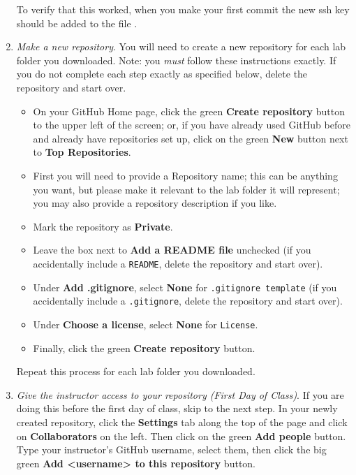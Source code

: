 \begin{enumerate}
    To verify that this worked, when you make your first commit the new ssh key should be added to the file .
  
    \item \emph{Make a new repository}.
    You will need to create a new repository for each lab folder you downloaded.
    Note: you \emph{must} follow these instructions exactly. 
    If you do not complete each step exactly as specified below, delete the repository and start over.
    \begin{itemize}
        \item On your GitHub Home page, click the green \textbf{Create repository} button to the upper left of the screen; or, if you have already used GitHub before and already have repositories set up, click on the green \textbf{New} button next to \textbf{Top Repositories}.
        \item First you will need to provide a Repository name; this can be anything you want, but please make it relevant to the lab folder it will represent; you may also provide a repository description if you like.
        \item Mark the repository as \textbf{Private}.
        \item Leave the box next to \textbf{Add a README file} unchecked (if you accidentally include a \texttt{README}, delete the repository and start over).
        \item Under \textbf{Add .gitignore}, select \textbf{None} for \texttt{.gitignore template} (if you accidentally include a \texttt{.gitignore}, delete the repository and start over).
        \item Under \textbf{Choose a license}, select \textbf{None} for \texttt{License}.
        \item Finally, click the green \textbf{Create repository} button.
    \end{itemize}
    Repeat this process for each lab folder you downloaded.
  
    \item \emph{Give the instructor access to your repository (First Day of Class)}.
    If you are doing this before the first day of class, skip to the next step.
    In your newly created repository, click the \textbf{Settings} tab along the top of the page and click on \textbf{Collaborators} on the left.
    Then click on the green \textbf{Add people} button.
    Type your instructor's GitHub username, select them, then click the big green \textbf{Add <username> to this repository} button.


\end{enumerate}
